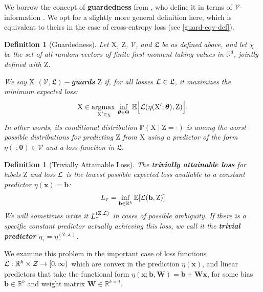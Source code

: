 \documentclass{article}
\theoremstyle{plain}
\newtheorem{definition}[theorem]{Definition}
\theoremstyle{remark}
\newcommand{\vtheta}{{ \boldsymbol \theta}}
\newcommand{\E}{\mathbb E}
\newcommand{\Ltriv}{L_\tau}
\newcommand{\Ltrivfull}{L_\tau^{(\rv Z, \loss)}}
\theoremstyle{plain}
\theoremstyle{TheoremNum}
\newcommand{\rv}[1]{{\mathrm{#1}}}
\newcommand{\loss}{\color{black} \mathcal{L}}
\begin{document}
We borrow the concept of \textbf{guardedness} from \citet{ravfogel2022linear}, who define it in terms of $\mathcal V$-information \citep{xu2020theory}. We opt for a slightly more general definition here, which is equivalent to theirs in the case of cross-entropy loss (see \autoref{guard-eqv-def}).

\begin{definition}[Guardedness]\label{def:guardedness}
Let $\rv X$, $\rv Z$, $\mathcal V$, and $\mathfrak L$ be as defined above, and let $\chi$ be the set of all random vectors of finite first moment taking values in $\mathbb R^d$, jointly defined with $\rv Z$.

We say $\rv X$ $(\mathcal V, \mathfrak L)-$\textbf{guards} $\rv Z$ if, for all losses $\loss \in \mathfrak L$, it maximizes the minimum expected loss:
\begin{equation*}
    \rv X \in \mathop{\mathrm{argmax\:}}_{\substack{\rv X' \in \chi}} \inf_{\vtheta \in \Theta}\: \E \Big [ \loss(\eta(\rv X'; \vtheta), \rv Z) \Big ].
\end{equation*}
In other words, its conditional distribution $\mathbb P(\rv X \mid \rv Z = \cdot)$ is among the worst possible distributions for predicting $\rv Z$ from $\rv X$ using a predictor of the form $\eta(\cdot; \vtheta) \in \mathcal V$ and a loss function in $\mathfrak L$.
\end{definition}

\begin{definition}[Trivially Attainable Loss]\label{def:trivial_loss}
The \textbf{trivially attainable loss} for labels $\rv Z$ and loss $\loss$ is the lowest possible expected loss available to a constant predictor $\eta(\mathbf{x}) = \mathbf {b}$:
\begin{equation*}
    \Ltriv = \inf_{\mathbf{b} \in \mathbb R^k} \E [\loss(\mathbf b, \rv Z)]
\end{equation*}
We will sometimes write it $\Ltrivfull$ in cases of possible ambiguity. If there is a specific constant predictor actually achieving this loss, we call it the \textbf{trivial predictor} $\eta_\tau = \eta_\tau^{(\rv Z, \mathcal L)}$.
\end{definition}

We examine this problem in the important case of loss functions $\loss: \mathbb{R}^k \times \mathcal{Z} \to [0, \infty)$ which are convex in the prediction $\eta(\mathbf{x})$, and linear predictors that take the functional form $\eta(\mathbf{x}; \mathbf b, \mathbf W) = \mathbf b + \mathbf{W}\mathbf{x}$, for some bias $\mathbf b \in \mathbb{R}^{k}$ and weight matrix $\mathbf W \in \mathbb{R}^{k \times d}$.
\end{document}
